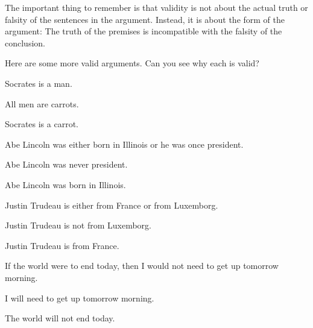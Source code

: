 The important thing to remember is that validity is not about the actual truth or falsity of the sentences in the argument. Instead, it is about the form of the argument: The truth of the premises is incompatible with the falsity of the conclusion.

Here are some more valid arguments. Can you see why each is valid?

\begin{earg}
\item Socrates is a man.
\item All men are carrots.
\item[\therefore] Socrates is a carrot.
\end{earg}


\begin{earg}
\item Abe Lincoln was either born in Illinois or he was once president.
\item Abe Lincoln was never president.
\item[\therefore] Abe Lincoln was born in Illinois.
\end{earg}

\begin{earg}
\item Justin Trudeau is either from France or from Luxemborg.
\item Justin Trudeau is not from Luxemborg.
\item[\therefore] Justin Trudeau is from France.
\end{earg}


\begin{earg}
\item If the world were to end today, then I would not need to get up tomorrow morning.
\item I will need to get up tomorrow morning.
\item[\therefore] The world will not end today.
\end{earg}


